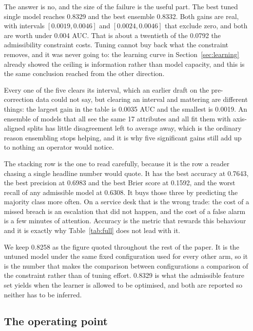 The answer is no, and the size of the failure is the useful part. The best tuned single model
reaches \num{0.8329} and the best ensemble \num{0.8332}. Both gains are real, with intervals
$[\num{0.0019}, \num{0.0046}]$ and $[\num{0.0024}, \num{0.0046}]$ that exclude zero, and both
are worth under \num{0.004} AUC. That is about a twentieth of the \num{0.0792} the admissibility
constraint costs. Tuning cannot buy back what the constraint removes, and it was never going to:
the learning curve in Section~\ref{sec:learning} already showed the ceiling is information
rather than model capacity, and this is the same conclusion reached from the other direction.

Every one of the five clears its interval, which an earlier draft on the pre-correction data
could not say, but clearing an interval and mattering are different things: the largest gain
in the table is \num{0.0035} AUC and the smallest is \num{0.0019}. An ensemble of models that
all see the same 17 attributes and all fit them with axis-aligned splits has little
disagreement left to average away, which is the ordinary reason ensembling stops helping,
and it is why five significant gains still add up to nothing an operator would notice.

The stacking row is the one to read carefully, because it is the row a reader chasing a single
headline number would quote. It has the best accuracy at \num{0.7643}, the best precision at
\num{0.6983} and the best Brier score at \num{0.1592}, and the worst recall of any admissible
model at \num{0.6308}. It buys those three by predicting the majority class more often. On a
service desk that is the wrong trade: the cost of a missed breach is an escalation that did not
happen, and the cost of a false alarm is a few minutes of attention. Accuracy is the metric that
rewards this behaviour and it is exactly why Table~\ref{tab:full} does not lead with it.

We keep \num{0.8258} as the figure quoted throughout the rest of the paper. It is the untuned
model under the same fixed configuration used for every other arm, so it is the number that
makes the comparison between configurations a comparison of the constraint rather than of
tuning effort. \num{0.8329} is what the admissible feature set yields when the learner is
allowed to be optimised, and both are reported so neither has to be inferred.

\subsection{The operating point}
\label{sec:threshold}

